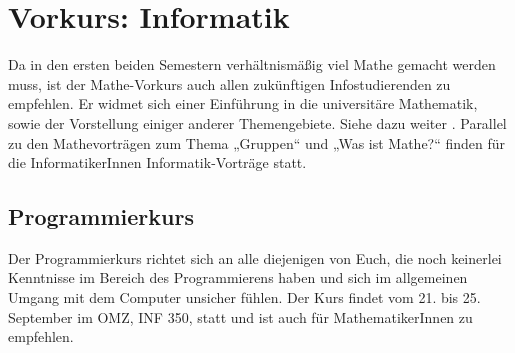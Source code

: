 \section{Vorkurs: Informatik}
\label{vkinfo}
Da in den ersten beiden Semestern verhältnismäßig viel Mathe gemacht werden muss, ist der Mathe-Vorkurs auch allen zukünftigen Infostudierenden zu empfehlen. Er widmet sich einer Einführung in die universitäre Mathematik, sowie der Vorstellung einiger anderer Themengebiete. Siehe dazu weiter
.
Parallel zu den Mathevorträgen zum Thema „Gruppen“ und „Was ist Mathe?“ finden für die InformatikerInnen Informatik-Vorträge statt.

\parskip

\subsection{Programmierkurs}
Der Programmierkurs richtet sich an alle diejenigen von Euch, die noch keinerlei Kenntnisse im Bereich des Programmierens haben und sich im allgemeinen Umgang mit dem Computer unsicher fühlen. Der Kurs findet vom 21. bis 25. September im OMZ, \gls{INF} 350, statt und ist auch für MathematikerInnen zu empfehlen.



